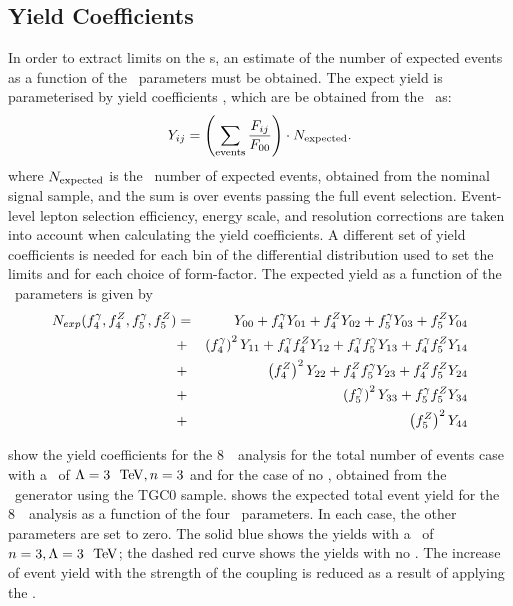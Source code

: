 \subsection{Yield Coefficients}

In order to extract limits on the \TGC s, an estimate of the number of expected events as a
function of the \TGC\ parameters must be obtained. The expect yield is parameterised by
yield coefficients \Yij, which are be obtained from the \Fij\ as:
\begin{equation}
Y_{ij} = \left( \sum_{\rm events} \frac{F_{ij}}{F_{00} } \right) \cdot{N_{\rm expected}}.
\end{equation}
where $N_{\rm expected}$ is the \sm\ number of expected events, obtained from the
nominal signal sample, and the sum is over events passing the full event
selection. Event-level lepton selection efficiency, energy scale, and resolution corrections
are taken into account when calculating the yield coefficients. A different set of yield
coefficients is needed for each bin of the differential distribution used to set
the limits and for each choice of
form-factor. The expected yield as a function of the \TGC\ parameters is given by
\begin{eqnarray}\label{eqn:Nexp_TGC}
N_{exp} (f_{4}^{\gamma}, f_{4}^{Z}, f_{5}^{\gamma}, f_{5}^{Z}) & = & Y_{00} + f_4^\gamma Y_{01} + f_4^Z Y_{02} + f_5^\gamma Y_{03} + f_5^Z Y_{04}  \nonumber \\
&+& \left(f_4^\gamma\right)^2Y_{11} + f_4^\gamma f_4^Z Y_{12} +  f_4^\gamma f_5^\gamma Y_{13} + f_4^\gamma f_5^Z Y_{14}  \nonumber \\
&+& \left(f_4^Z\right)^2Y_{22} + f_4^Zf_5^\gamma Y_{23} + f_4^Zf_5^Z Y_{24}  \nonumber \\
&+& \left(f_5^\gamma\right)^2Y_{33} + f_5^\gamma f_5^Z Y_{34} \nonumber \\
&+& \left(f_5^Z\right)^2Y_{44}
\end{eqnarray}

 show the yield
coefficients for the 8~\tev\ analysis for the total number of events case with a
\formfactor\ of $\Lambda=3~\tev, n=3$ and for the case of no \formfactor,
obtained from the \BR\ generator using the TGC0 sample.  
shows the expected total event yield for the 8~\tev\ analysis as a function of
the four \TGC\ parameters. In each case, the other parameters are set to zero.
The solid blue shows the yields with a \formfactor\ of $n=3, \Lambda=3~\tev$;
the dashed red curve shows the yields with no \formfactor. The increase of event
yield with the strength of the coupling is reduced as a result of applying the
\formfactor.

